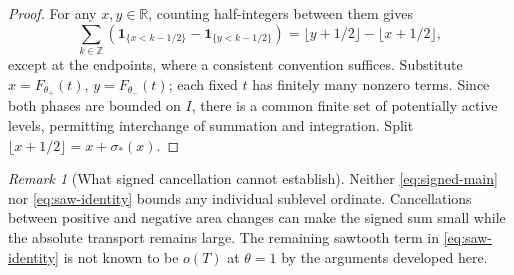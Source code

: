 \documentclass[11pt,leqno]{amsart}
\numberwithin{equation}{section}
\theoremstyle{definition}
\theoremstyle{remark}
\newtheorem{remark}[theorem]{Remark}
\newcommand{\R}{\mathbb R}
\newcommand{\1}{\mathbf 1}
\newcommand{\floor}[1]{\lfloor #1\rfloor}
\begin{document}
\begin{proof}
For any $x,y\in\R$, counting half-integers between them gives
\[
 \sum_{k\in\mathbb Z}(\1_{\{x<k-1/2\}}-\1_{\{y<k-1/2\}})
 =\floor{y+1/2}-\floor{x+1/2},
\]
except at the endpoints, where a consistent convention suffices. Substitute $x=F_{\theta_+}(t)$, $y=F_{\theta_-}(t)$; each fixed $t$ has finitely many nonzero terms. Since both phases are bounded on $I$, there is a common finite set of potentially active levels, permitting interchange of summation and integration. Split $\floor{x+1/2}=x+\sigma_*(x)$.
\end{proof}
\begin{remark}[What signed cancellation cannot establish]\label{rem:signed-limit}
Neither \eqref{eq:signed-main} nor \eqref{eq:saw-identity} bounds any individual sublevel ordinate. Cancellations between positive and negative area changes can make the signed sum small while the absolute transport remains large. The remaining sawtooth term in \eqref{eq:saw-identity} is not known to be $o(T)$ at $\theta=1$ by the arguments developed here.
\end{remark}
\end{document}
